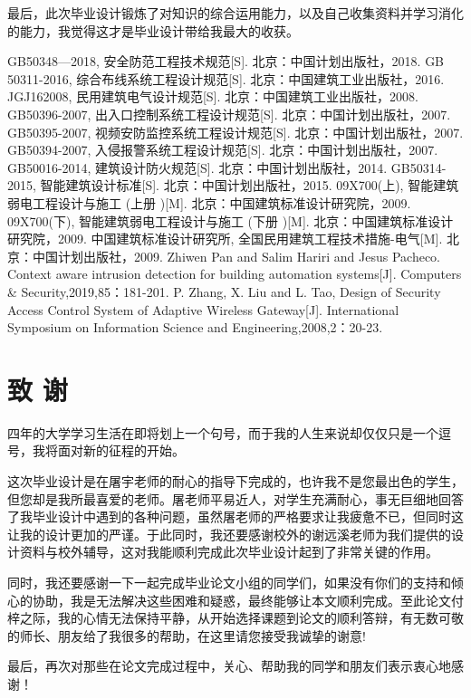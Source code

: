 \documentclass{gdutart}
\begin{document}
  最后，此次毕业设计锻炼了对知识的综合运用能力，以及自己收集资料并学习消化的能力，我觉得这才是毕业设计带给我最大的收获。\clearpage

  \begin{thebibliography}{}
     GB50348—2018, 安全防范工程技术规范[S]. 北京：中国计划出版社，2018.
     GB 50311-2016, 综合布线系统工程设计规范[S]. 北京：中国建筑工业出版社，2016.
     JGJ16­2008, 民用建筑电气设计规范[S]. 北京：中国建筑工业出版社，2008.
     GB50396-2007, 出入口控制系统工程设计规范[S]. 北京：中国计划出版社，2007.
     GB50395-2007, 视频安防监控系统工程设计规范[S]. 北京：中国计划出版社，2007.
     GB50394-2007, 入侵报警系统工程设计规范[S]. 北京：中国计划出版社，2007.
     GB50016-2014, 建筑设计防火规范[S]. 北京：中国计划出版社，2014.
     GB50314-2015, 智能建筑设计标准[S]. 北京：中国计划出版社，2015.
     09X700(上), 智能建筑弱电工程设计与施工 (上册 )[M]. 北京：中国建筑标准设计研究院，2009.
     09X700(下), 智能建筑弱电工程设计与施工 (下册 )[M]. 北京：中国建筑标准设计研究院，2009.
     中国建筑标准设计研究所, 全国民用建筑工程技术措施-电气[M]. 北京：中国计划出版社，2009.
     Zhiwen Pan and Salim Hariri and Jesus Pacheco. Context aware intrusion detection for building automation systems[J]. Computers \& Security,2019,85：181-201.
     P. Zhang, X. Liu and L. Tao, Design of Security Access Control System of Adaptive Wireless Gateway[J]. International Symposium on Information Science and Engineering,2008,2：20-23.
  \end{thebibliography}\clearpage

  \section*{致 \quad 谢}
  四年的大学学习生活在即将划上一个句号，而于我的人生来说却仅仅只是一个逗号，我将面对新的征程的开始。

  这次毕业设计是在屠宇老师的耐心的指导下完成的，也许我不是您最出色的学生，但您却是我所最喜爱的老师。屠老师平易近人，对学生充满耐心，事无巨细地回答了我毕业设计中遇到的各种问题，虽然屠老师的严格要求让我疲惫不已，但同时这让我的设计更加的严谨。于此同时，我还要感谢校外的谢远溪老师为我们提供的设计资料与校外辅导，这对我能顺利完成此次毕业设计起到了非常关键的作用。

  同时，我还要感谢一下一起完成毕业论文小组的同学们，如果没有你们的支持和倾心的协助，我是无法解决这些困难和疑惑，最终能够让本文顺利完成。至此论文付梓之际，我的心情无法保持平静，从开始选择课题到论文的顺利答辩，有无数可敬的师长、朋友给了我很多的帮助，在这里请您接受我诚挚的谢意!

  最后，再次对那些在论文完成过程中，关心、帮助我的同学和朋友们表示衷心地感谢！
\end{document}
